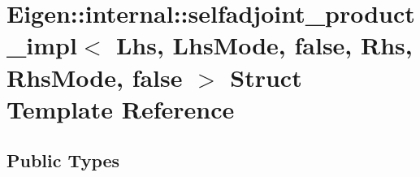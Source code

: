 \hypertarget{struct_eigen_1_1internal_1_1selfadjoint__product__impl_3_01_lhs_00_01_lhs_mode_00_01false_00_01_0e7941e7b3bc2131c413f23ec856f76c}{}\section{Eigen\+::internal\+::selfadjoint\+\_\+product\+\_\+impl$<$ Lhs, Lhs\+Mode, false, Rhs, Rhs\+Mode, false $>$ Struct Template Reference}
\label{struct_eigen_1_1internal_1_1selfadjoint__product__impl_3_01_lhs_00_01_lhs_mode_00_01false_00_01_0e7941e7b3bc2131c413f23ec856f76c}
\subsection*{Public Types}
